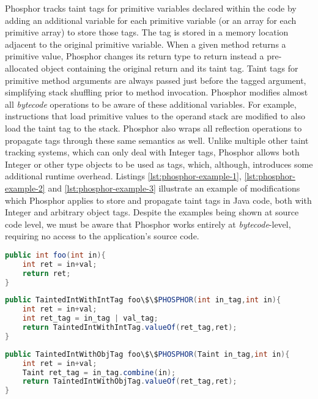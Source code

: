 Phosphor tracks taint tags for primitive variables declared within the code by adding an additional variable for each primitive variable (or an array for each primitive array) to store those tags. The tag is stored in a memory location adjacent to the original primitive variable. When a given method returns a primitive value, Phosphor changes its return type to return instead a pre-allocated object containing the original return and its taint tag. Taint tags for primitive method arguments are always passed just before the tagged argument, simplifying stack shuffling prior to method invocation. Phosphor modifies almost all \textit{bytecode} operations to be aware of these additional variables. For example, instructions that load primitive values to the operand stack are modified to also load the taint tag to the stack. Phosphor also wraps all reflection operations to propagate tags through these same semantics as well. Unlike multiple other taint tracking systems, which can only deal with Integer tags, Phosphor allows both Integer or other type objects to be used as tags, which, although, introduces some additional runtime overhead. Listings \ref{lst:phosphor-example-1}, \ref{lst:phosphor-example-2} and \ref{lst:phosphor-example-3} illustrate an example of modifications which Phosphor applies to store and propagate taint tags in Java code, both with Integer and arbitrary object tags. Despite the examples being shown at source code level, we must be aware that Phosphor works entirely at \textit{bytecode}-level, requiring no access to the application's source code.

\begin{lstlisting}[language=Java,caption=Original Java code, label=lst:phosphor-example-1]
public int foo(int in){
    int ret = in+val;
    return ret;
}
\end{lstlisting}

\begin{lstlisting}[language=Java,caption=Phosphor intrumentation with Integer return, label=lst:phosphor-example-2]
public TaintedIntWithIntTag foo\$\$PHOSPHOR(int in_tag,int in){
    int ret = in+val;
    int ret_tag = in_tag | val_tag;
    return TaintedIntWithIntTag.valueOf(ret_tag,ret);
}
\end{lstlisting}

\begin{lstlisting}[language=Java,caption=Phosphor intrumentation with Object return, label=lst:phosphor-example-3]
public TaintedIntWithObjTag foo\$\$PHOSPHOR(Taint in_tag,int in){
    int ret = in+val;
    Taint ret_tag = in_tag.combine(in);
    return TaintedIntWithObjTag.valueOf(ret_tag,ret);
}
\end{lstlisting}

